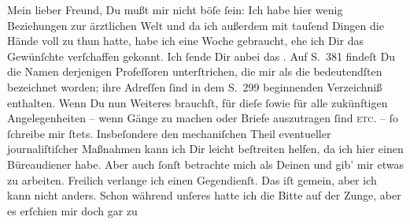 \pstart{}Mein lieber Freund,\pend\vspace{0.5em}
\pstart
           Du mußt mir nicht böſe{ }ſein: Ich habe hier wenig Beziehungen zur ärztlichen Welt und
               da ich außerdem mit tauſend Dingen die Hände voll zu thun hatte, habe ich eine Woche
               gebraucht, ehe ich Dir das Gewünſchte verſchaffen gekonnt. Ich{ }ſende Dir anbei das \label{K_L02719-1v}\label{K_L02719-1}. Auf S. 381 findeſt
               Du die Namen derjenigen Profeſſoren unterſtrichen, die mir als die bedeutendſten
               bezeichnet worden; ihre Adreſſen{ }ſind in dem S. 299 beginnenden {\pb}Verzeichniß enthalten. Wenn Du
               nun Weiteres brauchſt, für dieſe{ }ſowie für alle zukünftigen Angelegenheiten – wenn
               Gänge zu machen oder Briefe auszutragen{ }ſind \textsc{etc.} –{ }ſo{ }ſchreibe mir{ }ſtets. Insbeſondere den mechaniſchen Theil eventueller journaliſtiſcher
               Maßnahmen kann ich Dir leicht beſtreiten helfen, da ich hier einen Büreaudiener habe.
               Aber auch{ }ſonſt betrachte mich als Deinen \label{K_L02719-2v}\label{K_L02719-2} und gib’
               mir etwas zu {\pb}arbeiten. Freilich verlange ich einen
               Gegendienſt. Das iſt gemein, aber ich kann nicht anders. Schon während unſeres
                  \label{K_L02719-3v}\label{K_L02719-3} hatte ich die Bitte auf der Zunge, aber es erſchien mir doch gar zu
